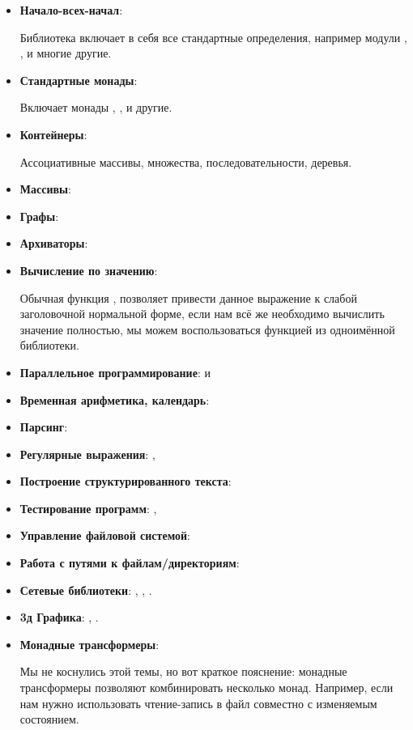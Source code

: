 \begin{itemize}
\item \textbf{Начало-всех-начал}: 

    Библиотека включает в себя все стандартные определения,
    например модули , , 
    и многие другие.

\item \textbf{Стандартные монады}:  

    Включает монады , , 
    и другие.
    

\item \textbf{Контейнеры}: 

    Ассоциативные массивы, множества, последовательности, деревья. 

\item \textbf{Массивы}: 

\item \textbf{Графы}: 

\item \textbf{Архиваторы}: 
\item \textbf{Вычисление по значению}: 
    
    Обычная функция , позволяет привести данное
    выражение к слабой заголовочной нормальной форме,
    если нам всё же необходимо вычислить значение полностью,
    мы можем воспользоваться функцией  из 
    одноимённой библиотеки.

\item \textbf{Параллельное программирование}:  и 

\item \textbf{Временная арифметика, календарь}: 
\item \textbf{Парсинг}: 
\item \textbf{Регулярные выражения}: , 
\item \textbf{Построение структурированного текста}: 
\item \textbf{Тестирование программ}: , 
\item \textbf{Управление файловой системой}: 
\item \textbf{Работа с путями к файлам/директориям}: 
\item \textbf{Сетевые библиотеки}: , , .
\item \textbf{3д Графика}: , .

\item \textbf{Монадные трансформеры}: 

    Мы не коснулись этой темы, но вот краткое пояснение:
    монадные трансформеры позволяют комбинировать несколько
    монад. Например, если нам нужно использовать чтение-запись 
    в файл совместно с изменяемым состоянием.

\end{itemize}

